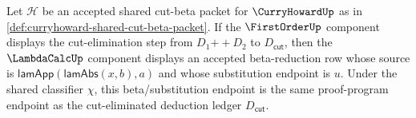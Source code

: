 \begin{theorem}\label{thm:curryhoward-cut-beta-bridge-obligation}
Let $\mathcal H$ be an accepted shared cut-beta packet for $\CurryHowardUp$ as in \autoref{def:curryhoward-shared-cut-beta-packet}. If the $\FirstOrderUp$ component displays the cut-elimination step from $D_1 \mathbin{+\!\!+} D_2$ to $D_{\mathsf{cut}}$, then the $\LambdaCalcUp$ component displays an accepted beta-reduction row whose source is $\mathsf{lamApp}(\mathsf{lamAbs}(x,b),a)$ and whose substitution endpoint is $u$. Under the shared classifier $\chi$, this beta/substitution endpoint is the same proof-program endpoint as the cut-eliminated deduction ledger $D_{\mathsf{cut}}$.
\end{theorem}
